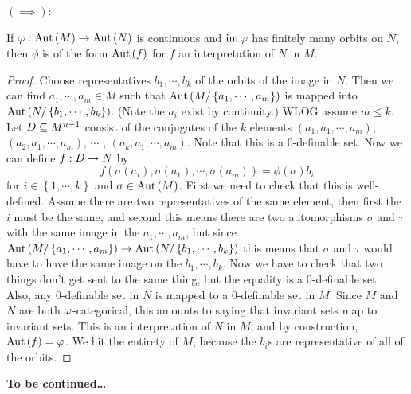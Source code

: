 \documentclass{amsart}
\begin{document}
\begin{Proof}
$\left( \implies \right)$:
\begin{clm}
If $\varphi:\operatorname{Aut}\left( M \right) \rightarrow\operatorname{Aut}\left( N \right)$ is continuous and
$\operatorname{im} \varphi$ has finitely many orbits on $N$, then $\phi$ is of the form $\operatorname{Aut}\left( f \right)$
for $f$ an interpretation of $N$ in $M$.
\end{clm}
\begin{proof}
Choose representatives $b_1 , \cdots , b_k$ of the orbits of the image in $N$.
Then we can find $a_1, \cdots , a_m\in M$ such that 
$\operatorname{Aut}\left( M / \left\{ a_1 , \cdots , a_m \right\} \right)$ is mapped into
$\operatorname{Aut}\left( N  / \left\{ b_1 , \cdots , b_k \right\}\right)$. 
(Note the $a_i$ exist by continuity.)
WLOG assume $m \leq k$. Let $D\subseteq M^{n+1}$ consist of the conjugates of the $k$ elements 
$\left( a_1 , a_1 , \cdots , a_m \right)$, 
$\left( a_2 , a_1 , \cdots , a_m \right)$, $\cdots$ ,
$\left( a_k , a_1 , \cdots , a_m \right)$.
Note that this is a $0$-definable set.
Now we can define $f:D\rightarrow N$ by
\begin{equation}
f\left( \sigma\left( a_i \right) , \sigma\left( a_1 \right) , \cdots , \sigma\left( a_m \right) \right) = 
\phi\left( \sigma \right) b_i
\end{equation}
for $i\in \left\{ 1 , \cdots , k \right\}$ and $\sigma \in \operatorname{Aut}\left( M \right)$.
First we need to check that this is well-defined.
Assume there are two representatives of the same element, 
then first the $i$ must be the same, and second this means there are two automorphisms $\sigma$
and $\tau$ with the same image in the $a_1 , \cdots , a_m$, 
but since $\operatorname{Aut}\left( M / \left\{ a_1 , \cdots , a_m \right\} \right) \rightarrow 
\operatorname{Aut}\left( N / \left\{ b_1 , \cdots , b_k \right\} \right)$
this means that $\sigma$ and $\tau$ would have to have the same image on the $b_1 , \cdots , b_k$. 
Now we have to check that two things don't get sent to the same thing,
but the equality is a $0$-definable set.
Also, any $0$-definable set in $N$ is mapped to a $0$-definable set in $M$.
Since $M$ and $N$ are both $\omega$-categorical, 
this amounts to saying that invariant sets map to invariant sets.
This is an interpretation of $N$ in $M$,
and by construction, $\operatorname{Aut}\left( f \right)= \varphi$. 
We hit the entirety of $M$, because the $b_i$s are representative of all of the orbits.
\end{proof}
\begin{center}
\textbf{To be continued\ldots}
\end{center}
\end{Proof}
\end{document}
